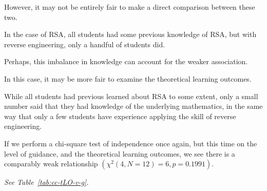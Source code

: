         However, it may not be entirely fair to make a direct comparison between these two. %



In the case of RSA, all students had some previous knowledge of RSA, but with reverse engineering, only a handful of students did. %



Perhaps, this imbalance in knowledge can account for the weaker association. %



In this case, it may be more fair to examine the theoretical learning outcomes. %



While all students had previous learned about RSA to some extent, only a small number said that they had knowledge of the underlying mathematics, in the same way that only a few students have experience applying the skill of reverse engineering. %



If we perform a chi-square test of independence once again, but this time on the level of guidance, and the theoretical learning outcomes, we see there is a comparably weak relationship $(\chi^2(4, N=12)=6,  p = 0.1991)$. %



\emph{See Table~\ref{tab:cc-tLO-v-g}.}








